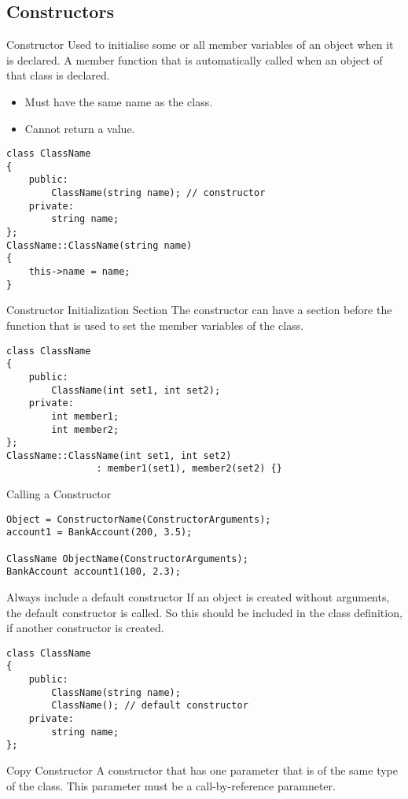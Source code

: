 \documentclass[\main/notes.tex]{subfiles}
\begin{document}
			\subsection{Constructors}
				\begin{definition}{Constructor}
					Used to initialise some or all member variables of an object when it is declared. A member function that is automatically called when an object of that class is declared.
					\begin{itemize}[nosep]
						\item Must have the same name as the class.
						\item Cannot return a value.
					\end{itemize}
					\begin{verbatim}
class ClassName
{
	public:
		ClassName(string name); // constructor
	private:
		string name;
};
ClassName::ClassName(string name)
{
	this->name = name;
}
					\end{verbatim}
				\end{definition}
				\begin{sidenote}{Constructor Initialization Section}
					The constructor can have a section before the function that is used to set the member variables of the class.
					\begin{verbatim}
class ClassName
{
	public:
		ClassName(int set1, int set2);
	private:
		int member1;
		int member2;
};
ClassName::ClassName(int set1, int set2)
				: member1(set1), member2(set2) {}
					\end{verbatim}
				\end{sidenote}
				\begin{codebox}{Calling a Constructor}
					\begin{verbatim}
Object = ConstructorName(ConstructorArguments);
account1 = BankAccount(200, 3.5);

ClassName ObjectName(ConstructorArguments);
BankAccount account1(100, 2.3);
					\end{verbatim}
				\end{codebox}
				\begin{sidenote}{Always include a default constructor}
					If an object is created without arguments, the default constructor is called. So this should be included in the class definition, if another constructor is created.
					\begin{verbatim}
class ClassName
{
	public:
		ClassName(string name);
		ClassName(); // default constructor
	private:
		string name;
};
					\end{verbatim}
				\end{sidenote}
				\begin{definition}{Copy Constructor}
					A constructor that has one parameter that is of the same type of the class. This parameter must be a call-by-reference paramneter.
				\end{definition}
\end{document}
